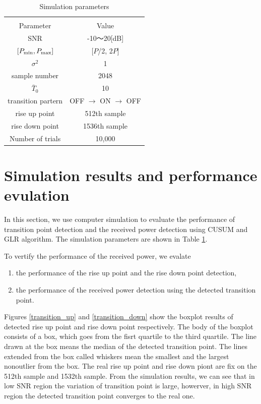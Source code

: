 \begin{table}[t]
\begin{center}
 \caption{\normalsize{Simulation parameters}}
 
\normalsize

  \begin{tabular}{c|c}
    & \\
    Parameter &Value \\ \hline
    SNR & -10〜20[dB] \\
    $[P_{{\rm min}},P_{{\rm max}}]$ & [$P$/2, 2$P$] \\
    $\sigma^2$ & 1 \\
    sample number & 2048 \\
    $\bar{T}_0$ & 10 \\
    transition partern & OFF $\rightarrow$ ON $\rightarrow$ OFF \\
    rise up point & 512th sample\\
    rise down point & 1536th sample\\
    Number of trials & 10,000 \\ \hline
  \end{tabular}
\label{parameter}
\end{center}
\end{table}
\section{Simulation results and performance evulation}
In this section, we use computer simulation to evaluate the performance of transition point detection and the received power detection using CUSUM and GLR algorithm. The simulation parameters are shown in Table \ref{parameter}.

To vertify the performance of the received power, we evalate

\begin{enumerate}
\item the performance of the rise up point and the rise down point detection, 
\item the performance of the received power detection using the detected transition point.
\end{enumerate}
Figures \ref{transition_up} and \ref{transition_down} show the boxplot results of detected rise up point and rise down point respectively. The body of the boxplot consists of a box, which goes from the fisrt quartile to the third quartile. The line drawn at the box means the median of the detected transition point. The lines extended from the box called whiskers mean the smallest and the largest nonoutlier from the box. The real rise up point and rise down piont are fix on the 512th sample and 1532th sample. From the simulation results, we can see that in low SNR region the variation of transition point is large, howerver, in high SNR region the detected transition point converges to the real one.

